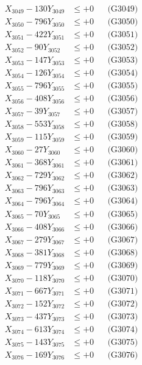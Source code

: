\documentclass[a4paper,10pt]{article}
\begin{document}
{\begin{align}
X_{3049} - 130Y_{3049} &\leq +0 && \text{(G3049)} \\
X_{3050} - 796Y_{3050} &\leq +0 && \text{(G3050)} \\
\allowbreak
X_{3051} - 422Y_{3051} &\leq +0 && \text{(G3051)} \\
X_{3052} - 90Y_{3052} &\leq +0 && \text{(G3052)} \\
X_{3053} - 147Y_{3053} &\leq +0 && \text{(G3053)} \\
X_{3054} - 126Y_{3054} &\leq +0 && \text{(G3054)} \\
X_{3055} - 796Y_{3055} &\leq +0 && \text{(G3055)} \\
X_{3056} - 408Y_{3056} &\leq +0 && \text{(G3056)} \\
X_{3057} - 39Y_{3057} &\leq +0 && \text{(G3057)} \\
X_{3058} - 553Y_{3058} &\leq +0 && \text{(G3058)} \\
X_{3059} - 115Y_{3059} &\leq +0 && \text{(G3059)} \\
X_{3060} - 27Y_{3060} &\leq +0 && \text{(G3060)} \\
\allowbreak
X_{3061} - 368Y_{3061} &\leq +0 && \text{(G3061)} \\
X_{3062} - 729Y_{3062} &\leq +0 && \text{(G3062)} \\
X_{3063} - 796Y_{3063} &\leq +0 && \text{(G3063)} \\
X_{3064} - 796Y_{3064} &\leq +0 && \text{(G3064)} \\
X_{3065} - 70Y_{3065} &\leq +0 && \text{(G3065)} \\
X_{3066} - 408Y_{3066} &\leq +0 && \text{(G3066)} \\
X_{3067} - 279Y_{3067} &\leq +0 && \text{(G3067)} \\
X_{3068} - 381Y_{3068} &\leq +0 && \text{(G3068)} \\
X_{3069} - 779Y_{3069} &\leq +0 && \text{(G3069)} \\
X_{3070} - 118Y_{3070} &\leq +0 && \text{(G3070)} \\
\allowbreak
X_{3071} - 667Y_{3071} &\leq +0 && \text{(G3071)} \\
X_{3072} - 152Y_{3072} &\leq +0 && \text{(G3072)} \\
X_{3073} - 437Y_{3073} &\leq +0 && \text{(G3073)} \\
X_{3074} - 613Y_{3074} &\leq +0 && \text{(G3074)} \\
X_{3075} - 143Y_{3075} &\leq +0 && \text{(G3075)} \\
X_{3076} - 169Y_{3076} &\leq +0 && \text{(G3076)} \\

\end{align}}
\end{document}
